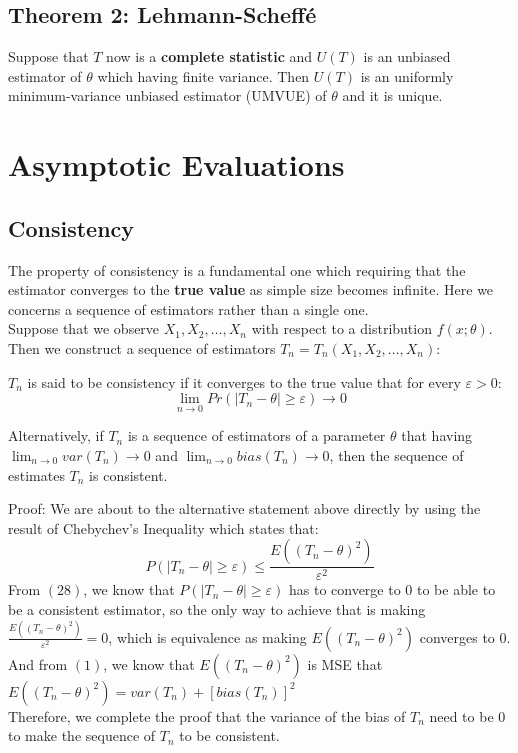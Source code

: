 \documentclass[12pt ]{article}
\begin{document}
\subsection{Theorem 2: Lehmann-Scheffé}
Suppose that $T$ now is a \textbf{complete statistic} and $U(T)$ is an unbiased estimator of $\theta$ which having finite variance. Then $U(T)$  is an uniformly minimum-variance unbiased estimator (UMVUE) of $\theta$ and it is unique. 

\section{Asymptotic Evaluations}
\subsection{Consistency}
The property of consistency is a fundamental one which requiring that the estimator converges to the \textbf{true value} as simple size becomes infinite. Here we concerns a sequence of estimators rather than a single one. \\

Suppose that we observe $X_{1}, X_{2}, \ldots, X_{n}$ with respect to a distribution $f(x;\theta)$. Then we construct a sequence of estimators $T_{n} = T_{n}(X_{1}, X_{2}, \ldots, X_{n})$:

$T_{n}$ is said to be consistency if it converges to the true value that for every $\varepsilon > 0$:
\begin{equation}
\lim_{n\rightarrow 0}Pr(|T_{n} - \theta| \geq \varepsilon) \rightarrow 0
\end{equation}


Alternatively, if $T_{n}$ is a sequence of estimators of a parameter $\theta$ that having $\lim_{n\rightarrow 0} var(T_{n}) \rightarrow 0$ and $\lim_{n\rightarrow 0} bias(T_{n}) \rightarrow 0$, then the sequence of estimates $T_{n}$ is consistent.\begin{equation}\end{equation}

Proof:
We are about to the alternative statement above directly by using the result of Chebychev's Inequality which states that:
\begin{equation*}
P(|T_{n} - \theta | \geq \varepsilon) \leq \frac{E((T_{n} - \theta)^2)}{\varepsilon^2}
\end{equation*}
From $(28)$, we know that $P(|T_{n} - \theta | \geq \varepsilon)$ has to converge to 0 to be able to be a consistent estimator, so the only way to achieve that is making $\frac{E((T_{n} - \theta)^2)}{\varepsilon^2} = 0$, which is equivalence as making $E((T_{n} - \theta)^2)$ converges to 0.\\
And from $(1)$, we know that $E((T_{n} - \theta)^2)$ is MSE that $E((T_{n} - \theta)^2) = var(T_{n}) + [bias(T_{n})]^2$ \\
Therefore, we complete the proof that the variance of the bias of $T_{n}$ need to be 0 to make the sequence of $T_{n}$ to be consistent. \\
\end{document}
